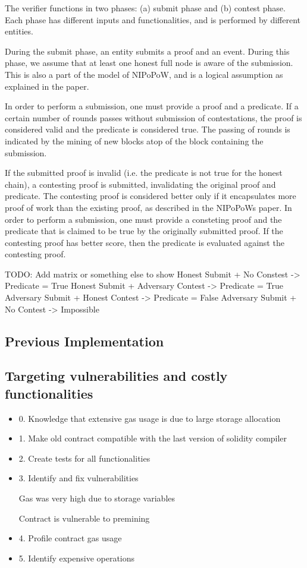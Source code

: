 \documentclass{article}
\begin{document}
  The verifier functions in two phases: (a) submit phase and (b) contest
  phase. Each phase has different inputs and functionalities, and is
  performed by different entities.

  During the submit phase, an entity submits a proof and an event.
  During this phase, we assume that at least one honest full node is
  aware of the submission. This is also a part of the model of NIPoPoW,
  and is a logical assumption as explained in the paper.

  In order to perform a submission, one must provide a proof and a
  predicate. If a certain number of rounds passes without submission of
  contestations, the proof is considered valid and the predicate is
  considered true. The passing of rounds is indicated by the mining of
  new blocks atop of the block containing the submission.

  If the submitted proof is invalid (i.e. the predicate is not true for
  the honest chain), a contesting proof is submitted, invalidating the
  original proof and predicate. The contesting proof is considered
  better only if it encapsulates more proof of work than the existing
  proof, as described in the NIPoPoWs paper. In order to perform a
  submission, one must provide a consteting proof and the predicate that
  is claimed to be true by the originally submitted proof. If the
  contesting proof has better score, then the predicate is evaluated
  against the contesting proof.

  TODO: Add matrix or something else to show Honest Submit + No Constest
  -> Predicate = True Honest Submit + Adversary Contest -> Predicate =
  True Adversary Submit + Honest Contest -> Predicate = False Adversary
  Submit + No Contest -> Impossible

  \subsection{Previous Implementation}

  \subsection{Targeting vulnerabilities and costly functionalities}

  \begin{itemize}
  \item
    0. Knowledge that extensive gas usage is due to large storage
    allocation
  \item
    1. Make old contract compatible with the last version of solidity
    compiler
  \item
    2. Create tests for all functionalities
  \item
    3. Identify and fix vulnerabilities

    Gas was very high due to storage variables

    Contract is vulnerable to premining
  \item
    4. Profile contract gas usage
  \item
    5. Identify expensive operations
  \end{itemize}
\end{document}
